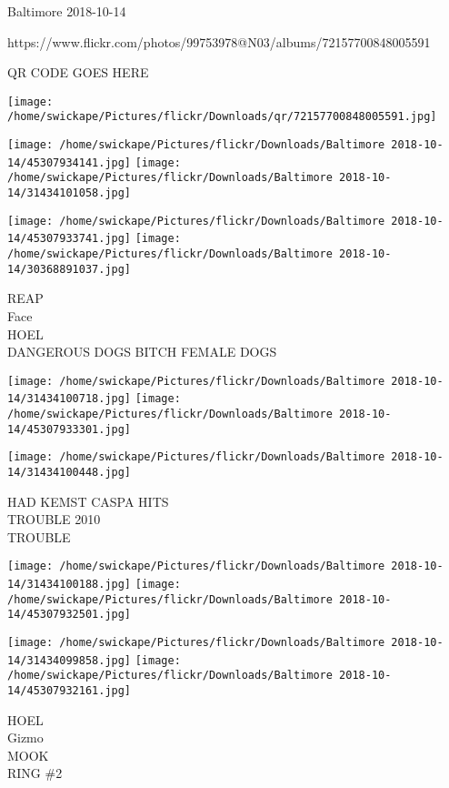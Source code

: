 \documentclass[10pt,letterpaper]{article}
\begin{document}
Baltimore 2018-10-14

https://www.flickr.com/photos/99753978@N03/albums/72157700848005591

QR CODE GOES HERE

\texttt{[image: /home/swickape/Pictures/flickr/Downloads/qr/72157700848005591.jpg]}
\pagebreak

\texttt{[image: /home/swickape/Pictures/flickr/Downloads/Baltimore 2018-10-14/45307934141.jpg]}
\texttt{[image: /home/swickape/Pictures/flickr/Downloads/Baltimore 2018-10-14/31434101058.jpg]}

\texttt{[image: /home/swickape/Pictures/flickr/Downloads/Baltimore 2018-10-14/45307933741.jpg]}
\texttt{[image: /home/swickape/Pictures/flickr/Downloads/Baltimore 2018-10-14/30368891037.jpg]}

REAP\\
Face\\
HOEL\\
DANGEROUS DOGS BITCH FEMALE DOGS\\
\pagebreak

\texttt{[image: /home/swickape/Pictures/flickr/Downloads/Baltimore 2018-10-14/31434100718.jpg]}
\texttt{[image: /home/swickape/Pictures/flickr/Downloads/Baltimore 2018-10-14/45307933301.jpg]}

\vspace{0.25in}
\texttt{[image: /home/swickape/Pictures/flickr/Downloads/Baltimore 2018-10-14/31434100448.jpg]}

HAD KEMST CASPA HITS\\
TROUBLE 2010\\
TROUBLE\\
\pagebreak

\texttt{[image: /home/swickape/Pictures/flickr/Downloads/Baltimore 2018-10-14/31434100188.jpg]}
\texttt{[image: /home/swickape/Pictures/flickr/Downloads/Baltimore 2018-10-14/45307932501.jpg]}

\texttt{[image: /home/swickape/Pictures/flickr/Downloads/Baltimore 2018-10-14/31434099858.jpg]}
\texttt{[image: /home/swickape/Pictures/flickr/Downloads/Baltimore 2018-10-14/45307932161.jpg]}

HOEL\\
Gizmo\\
MOOK\\
RING \#2\\
\pagebreak
\end{document}

